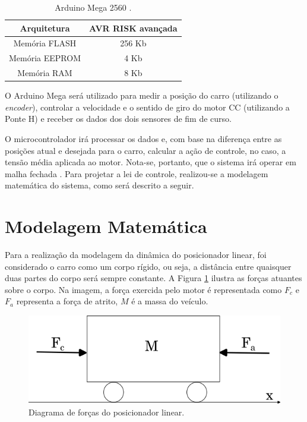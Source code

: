 \begin{table}[H]
    \centering
    \caption[Especificações técnicas Arduino Mega 2560]{Arduino Mega 2560 \cite{ATmega2560}.}
    \begin{tabular}{c|c}
    \textbf{Arquitetura} & \textbf{AVR RISK avançada} \\
    \hline
    Memória FLASH & 256 Kb \\
    Memória EEPROM & 4 Kb \\
    Memória RAM & 8 Kb \\
    \end{tabular}
    \label{tab:especificacoes}
\end{table}

O Arduino Mega será utilizado para medir a posição do carro (utilizando o \textit{encoder}), controlar a velocidade e o sentido de giro do motor CC (utilizando a Ponte H) e receber os dados dos dois sensores de fim de curso.

O microcontrolador irá processar os dados e, com base na diferença entre as posições atual e desejada para o carro, calcular a ação de controle, no caso, a tensão média aplicada ao motor. Nota-se, portanto, que o sistema irá operar em malha fechada \cite{ogata2010engenharia}. Para projetar a lei de controle, realizou-se a modelagem matemática do sistema, como será descrito a seguir.

\section{Modelagem Matemática}
Para a realização da modelagem da dinâmica do posicionador linear, foi considerado o carro como um corpo rígido, ou seja, a distância entre quaisquer duas partes do corpo será sempre constante. A Figura \ref{fig:corpo_rigido} ilustra as forças atuantes sobre o corpo. Na imagem, a força exercida pelo motor é representada como $F_c$ e $F_a$ representa a força de atrito, $M$ é a massa do veículo.

 \begin{figure}[H]
    \centering
    \includegraphics[width=0.6\linewidth]{figuras/diagrama_forcas.png}
    \caption[Diagrama de forças do posicionador linear]{Diagrama de forças do posicionador linear.}
    \label{fig:corpo_rigido}
\end{figure}

